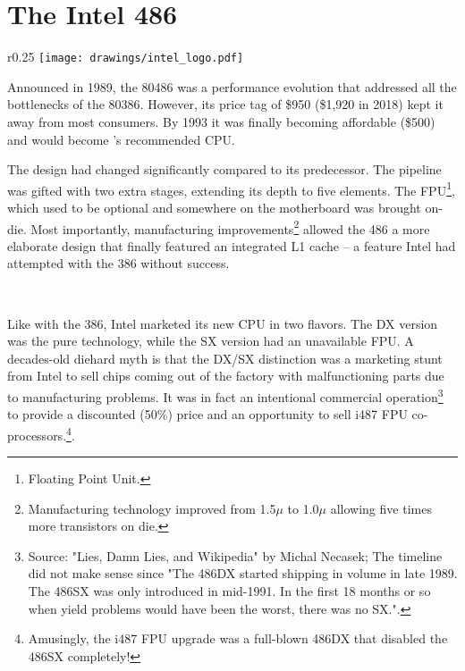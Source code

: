 \section{The Intel 486}

\begin{wrapfigure}[5]{r}{0.25\textwidth}
\centering
\texttt{[image: drawings/intel\_logo.pdf]}
\end{wrapfigure}

Announced in 1989, the 80486 was a performance evolution that addressed all the bottlenecks of the 80386. However, its price tag of \$950 (\$1,920 in 2018) kept it away from most consumers. By 1993 it was finally becoming affordable (\$500) and would become \doom{}'s recommended CPU.\\
\par
The design had changed significantly compared to its predecessor. The pipeline was gifted with two extra stages, extending its depth to five elements. The FPU\footnote{Floating Point Unit.}, which used to be optional and somewhere on the motherboard was brought on-die. Most importantly, manufacturing improvements\footnote{Manufacturing technology improved from 1.5$\mu$ to 1.0$\mu$ allowing five times more transistors on die.} allowed the 486 a more elaborate design that finally featured an integrated L1 cache -- a feature Intel had attempted with the 386 without success.\\
\par
{}\\
\par
{
\setlength{\belowcaptionskip}{-10pt}
}
\pagebreak
Like with the 386, Intel marketed its new CPU in two flavors. The DX version was the pure technology, while the SX version had an unavailable FPU. A decades-old diehard myth is that the DX/SX distinction was a marketing stunt from Intel to sell chips coming out of the factory with malfunctioning parts due to manufacturing problems. It was in fact an intentional commercial operation\footnote{Source: "Lies, Damn Lies, and Wikipedia" by Michal Necasek; The timeline did not make sense since "The 486DX started shipping in volume in late 1989. The 486SX was only introduced in mid-1991. In the first 18 months or so when yield problems would have been the worst, there was no SX.".} to provide a discounted (50\%) price and an opportunity to sell i487 FPU co-processors.\footnote{Amusingly, the i487 FPU upgrade was a full-blown 486DX that disabled the 486SX completely!}.\\
